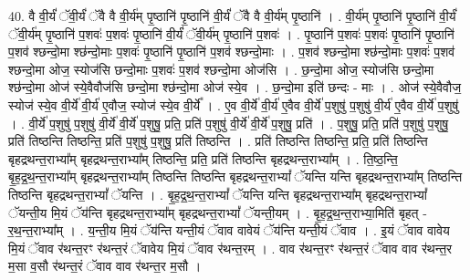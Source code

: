 \documentclass[17pt]{extarticle}
\begin{document}
40. वै वी॒र्यं॑ ॅवी॒र्यं॑ ॅवै वै वी॒र्य॑म् पृ॒ष्ठानि॑ पृ॒ष्ठानि॑ वी॒र्यं॑ ॅवै वै वी॒र्य॑म् पृ॒ष्ठानि॑ । . वी॒र्य॑म् पृ॒ष्ठानि॑ पृ॒ष्ठानि॑ वी॒र्यं॑ ॅवी॒र्य॑म् पृ॒ष्ठानि॑ प॒शवः॑ प॒शवः॑ पृ॒ष्ठानि॑ वी॒र्यं॑ ॅवी॒र्य॑म् पृ॒ष्ठानि॑ प॒शवः॑ । . पृ॒ष्ठानि॑ प॒शवः॑ प॒शवः॑ पृ॒ष्ठानि॑ पृ॒ष्ठानि॑ प॒शव॑ श्छन्दो॒मा श्छ॑न्दो॒माः प॒शवः॑ पृ॒ष्ठानि॑ पृ॒ष्ठानि॑ प॒शव॑ श्छन्दो॒माः । . प॒शव॑ श्छन्दो॒मा श्छ॑न्दो॒माः प॒शवः॑ प॒शव॑ श्छन्दो॒मा ओज॒ स्योज॑सि छन्दो॒माः प॒शवः॑ प॒शव॑ श्छन्दो॒मा ओज॑सि । . छ॒न्दो॒मा ओज॒ स्योज॑सि छन्दो॒मा श्छ॑न्दो॒मा ओज॑ स्ये॒वैवौज॑सि छन्दो॒मा श्छ॑न्दो॒मा ओज॑ स्ये॒व । . छ॒न्दो॒मा इति॑ छन्दः - माः । . ओज॑ स्ये॒वैवौज॒ स्योज॑ स्ये॒व वी॒र्ये॑ वी॒र्य॑ ए॒वौज॒ स्योज॑ स्ये॒व वी॒र्ये᳚ । . ए॒व वी॒र्ये॑ वी॒र्य॑ ए॒वैव वी॒र्ये॑ प॒शुषु॑ प॒शुषु॑ वी॒र्य॑ ए॒वैव वी॒र्ये॑ प॒शुषु॑ । . वी॒र्ये॑ प॒शुषु॑ प॒शुषु॑ वी॒र्ये॑ वी॒र्ये॑ प॒शुषु॒ प्रति॒ प्रति॑ प॒शुषु॑ वी॒र्ये॑ वी॒र्ये॑ प॒शुषु॒ प्रति॑ । . प॒शुषु॒ प्रति॒ प्रति॑ प॒शुषु॑ प॒शुषु॒ प्रति॑ तिष्ठन्ति तिष्ठन्ति॒ प्रति॑ प॒शुषु॑ प॒शुषु॒ प्रति॑ तिष्ठन्ति । . प्रति॑ तिष्ठन्ति तिष्ठन्ति॒ प्रति॒ प्रति॑ तिष्ठन्ति बृहद्रथन्त॒राभ्या᳚म् बृहद्रथन्त॒राभ्या᳚म् तिष्ठन्ति॒ प्रति॒ प्रति॑ तिष्ठन्ति बृहद्रथन्त॒राभ्या᳚म् । . ति॒ष्ठ॒न्ति॒ बृ॒ह॒द्र॒थ॒न्त॒राभ्या᳚म् बृहद्रथन्त॒राभ्या᳚म् तिष्ठन्ति तिष्ठन्ति बृहद्रथन्त॒राभ्यां᳚ ॅयन्ति यन्ति बृहद्रथन्त॒राभ्या᳚म् तिष्ठन्ति तिष्ठन्ति बृहद्रथन्त॒राभ्यां᳚ ॅयन्ति । . बृ॒ह॒द्र॒थ॒न्त॒राभ्यां᳚ ॅयन्ति यन्ति बृहद्रथन्त॒राभ्या᳚म् बृहद्रथन्त॒राभ्यां᳚ ॅयन्ती॒य मि॒यं ॅय॑न्ति बृहद्रथन्त॒राभ्या᳚म् बृहद्रथन्त॒राभ्यां᳚ ॅयन्ती॒यम् । . बृ॒ह॒द्र॒थ॒न्त॒राभ्या॒मिति॑ बृहत् - र॒थ॒न्त॒राभ्या᳚म् । . य॒न्ती॒य मि॒यं ॅय॑न्ति यन्ती॒यं ॅवाव वावेयं ॅय॑न्ति यन्ती॒यं ॅवाव । . इ॒यं ॅवाव वावेय मि॒यं ॅवाव र॑थन्त॒रꣳ र॑थन्त॒रं ॅवावेय मि॒यं ॅवाव र॑थन्त॒रम् । . वाव र॑थन्त॒रꣳ र॑थन्त॒रं ॅवाव वाव र॑थन्त॒र म॒सा व॒सौ र॑थन्त॒रं ॅवाव वाव र॑थन्त॒र म॒सौ । \newline
\end{document}
